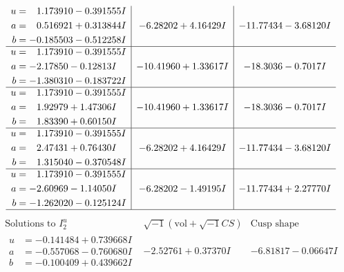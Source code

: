 \documentclass[1p]{elsarticle_modified}
\theoremstyle{definition}
\newcommand{\I}{\sqrt{-1}}
\begin{document}
$$\begin{array}{c|c|c}
\begin{aligned}
u &= \phantom{-}1.173910 - 0.391555 I \\
a &= \phantom{-}0.516921 + 0.313844 I \\
b &= -0.185503 - 0.512258 I\end{aligned}
 & -6.28202 + 4.16429 I & -11.77434 - 3.68120 I \\ \hline\begin{aligned}
u &= \phantom{-}1.173910 - 0.391555 I \\
a &= -2.17850 - 0.12813 I \\
b &= -1.380310 - 0.183722 I\end{aligned}
 & -10.41960 + 1.33617 I & -18.3036 - 0.7017 I \\ \hline\begin{aligned}
u &= \phantom{-}1.173910 - 0.391555 I \\
a &= \phantom{-}1.92979 + 1.47306 I \\
b &= \phantom{-}1.83390 + 0.60150 I\end{aligned}
 & -10.41960 + 1.33617 I & -18.3036 - 0.7017 I \\ \hline\begin{aligned}
u &= \phantom{-}1.173910 - 0.391555 I \\
a &= \phantom{-}2.47431 + 0.76430 I \\
b &= \phantom{-}1.315040 - 0.370548 I\end{aligned}
 & -6.28202 + 4.16429 I & -11.77434 - 3.68120 I \\ \hline\begin{aligned}
u &= \phantom{-}1.173910 - 0.391555 I \\
a &= -2.60969 - 1.14050 I \\
b &= -1.262020 - 0.125124 I\end{aligned}
 & -6.28202 - 1.49195 I & -11.77434 + 2.27770 I\\
 \hline 
 \end{array}$$\newpage$$\begin{array}{c|c|c}  
\text{Solutions to }I^u_{2}& \I (\text{vol} + \sqrt{-1}CS) & \text{Cusp shape}\\
 \hline 
\begin{aligned}
u &= -0.141484 + 0.739668 I \\
a &= -0.557068 - 0.760680 I \\
b &= -0.100409 + 0.439662 I\end{aligned}
 & -2.52761 + 0.37370 I & -6.81817 - 0.06647 I \\ \hline\begin{aligned}

\end{aligned}
\end{array}$$
\end{document}
